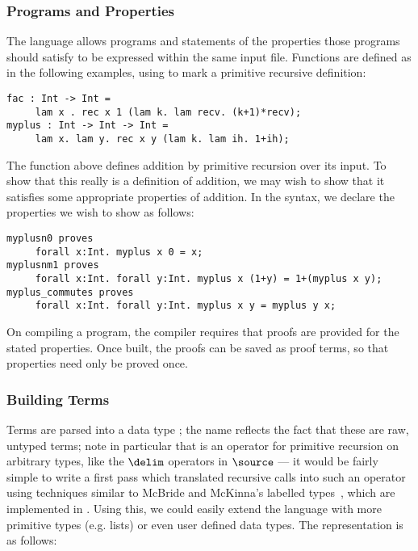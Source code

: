 \subsubsection{Programs and Properties}

The \Funl{} language allows programs and statements of the properties
those programs should satisfy to be expressed within the same input file.
Functions are defined as in the following examples, using 
to mark a primitive recursive definition:

\begin{verbatim}
fac : Int -> Int =
     lam x . rec x 1 (lam k. lam recv. (k+1)*recv);
myplus : Int -> Int -> Int =
     lam x. lam y. rec x y (lam k. lam ih. 1+ih);
\end{verbatim}

The  function above defines addition by primitive
recursion over its input. To show that this really is a definition of
addition, we may wish to show that it satisfies some appropriate
properties of addition. In the \Funl{} syntax, we declare the
properties we wish to show as follows:

\begin{verbatim}
myplusn0 proves 
     forall x:Int. myplus x 0 = x;
myplusnm1 proves 
     forall x:Int. forall y:Int. myplus x (1+y) = 1+(myplus x y);
myplus_commutes proves 
     forall x:Int. forall y:Int. myplus x y = myplus y x;
\end{verbatim}

On compiling a program, the compiler requires that proofs are provided
for the stated properties. Once built, the proofs can be saved as
proof terms, so that properties need only be proved once.

\subsubsection{Building Terms}
Terms are parsed into a data type ; the name
 reflects the fact that these are raw, untyped terms; note
in particular that  is an operator for primitive recursion
on arbitrary types, like the $\delim$ operators in $\source$ --- it
would be fairly simple to write a first pass which translated
recursive calls into such an operator using techniques similar to
McBride and McKinna's labelled types~\cite{view-left}, which are
implemented in \Ivor{}. Using this, we could easily extend the
language with more primitive types (e.g. lists) or even user defined
data types. The representation is as follows:


